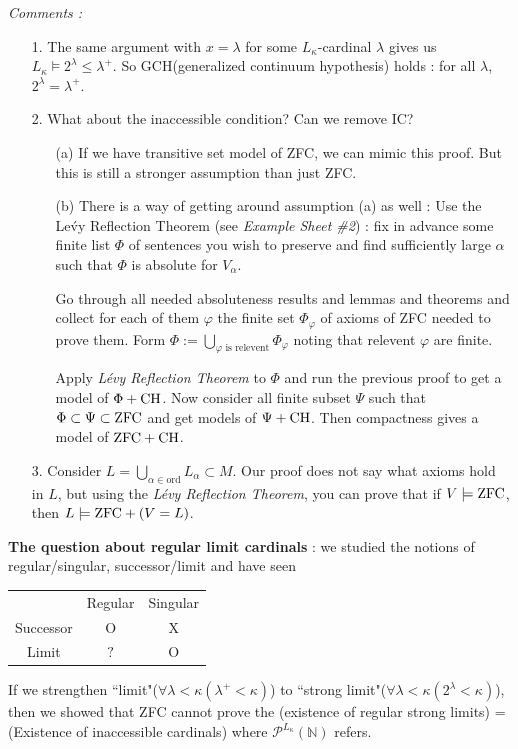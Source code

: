 \documentclass[12pt,a4paper]{article}
\begin{document}
\emph{Comments :}
\begin{itemize}
\item[1.] The same argument with $x= \lambda$ for some $L_{\kappa}$-cardinal $\lambda$ gives us $L_{\kappa} \models 2^{\lambda} \leq \lambda^+$. So GCH(generalized continuum hypothesis) holds : for all $\lambda$, $2^{\lambda} = \lambda^+$.
\item[2.] What about the inaccessible condition? Can we remove IC?
\begin{itemize}
\item[(a)] If we have transitive set model of ZFC, we can mimic this proof. But this is still a stronger assumption than just ZFC.
\item[(b)] There is a way of getting around assumption (a) as well : Use the Le\'vy Reflection Theorem (see \emph{Example Sheet \#2}) : fix in advance some finite list $\Phi$ of sentences you wish to preserve and find sufficiently large $\alpha$ such that $\Phi$ is absolute for $V_{\alpha}$. 

\quad Go through all needed absoluteness results and lemmas and theorems and collect for each of them $\varphi$ the finite set $\Phi_{\varphi}$ of axioms of ZFC needed to prove them. Form $\Phi := \bigcup_{\varphi \text{ is relevent}} \Phi_{\varphi}$ noting that relevent $\varphi$ are finite.

\quad Apply \emph{L\'evy Reflection Theorem} to $\Phi$ and run the previous proof to get a model of $\Phi + \text{CH}$. Now consider all finite subset $\Psi$ such that $\Phi \subset \Psi \subset \text{ZFC}$ and get models of $\Psi + \text{CH}$. Then compactness gives a model of $\text{ZFC} + \text{CH}$.
\end{itemize}
\item[3.] Consider $L = \bigcup_{\alpha \in \text{ord}} L_{\alpha} \subset M$. Our proof does not say what axioms hold in $L$, but using the \emph{L\'evy Reflection Theorem}, you can prove that if $V\models \text{ZFC}$, then $L \models \text{ZFC} + (V=L)$.
\end{itemize}
\s

\textbf{The question about regular limit cardinals} : we studied the notions of regular/singular, successor/limit and have seen
\begin{center}
\begin{tabular}{ c c c }
{} & Regular & Singular \\
Successor & O & X \\
Limit & $?$ & O
\end{tabular}
\end{center}
If we strengthen ``limit"($\forall \lambda< \kappa(\lambda^+< \kappa)$) to ``strong limit"($\forall \lambda< \kappa (2^{\lambda}  < \kappa)$), then we showed that ZFC cannot prove the (existence of regular strong limits) = (Existence of inaccessible cardinals) where $\mathscr{P}^{L_{\kappa}}(\mathbb{N})$ refers. 
\s
\end{document}
